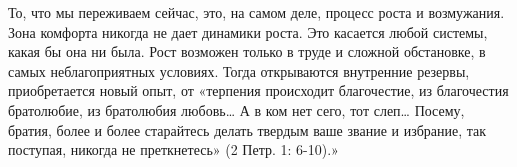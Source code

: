 То, что мы переживаем сейчас, это, на самом деле, процесс роста и возмужания.
Зона комфорта никогда не дает динамики роста. Это касается любой системы, какая
бы она ни была. Рост возможен только в труде и сложной обстановке, в самых
неблагоприятных условиях. Тогда открываются внутренние резервы, приобретается
новый опыт, от «терпения происходит благочестие, из благочестия братолюбие, из
братолюбия любовь… А в ком нет сего, тот слеп… Посему, братия, более и более
старайтесь делать твердым ваше звание и избрание, так поступая, никогда не
преткнетесь» (2 Петр. 1: 6-10).»

